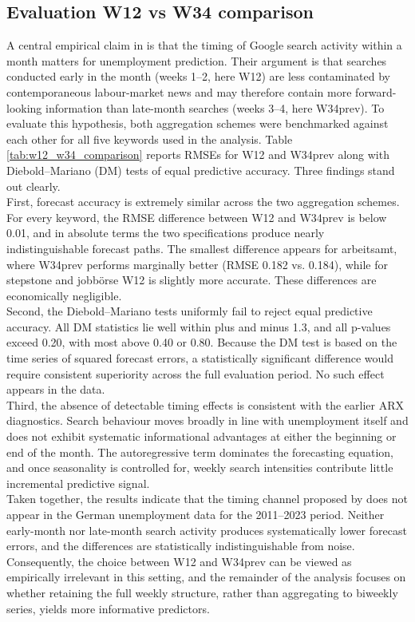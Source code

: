 \documentclass[12pt,a4paper]{article}
\begin{document}
\subsection{Evaluation W12 vs W34 comparison}
A central empirical claim in \citet{Askitas} is that the timing of Google search activity within a month matters for unemployment prediction. Their argument is that searches conducted early in the month (weeks 1–2, here W12) are less contaminated by contemporaneous labour-market news and may therefore contain more forward-looking information than late-month searches (weeks 3–4, here W34prev).
To evaluate this hypothesis, both aggregation schemes were benchmarked against each other for all five keywords used in the analysis.
Table \ref{tab:w12_w34_comparison} reports RMSEs for W12 and W34prev along with Diebold–Mariano (DM) tests of equal predictive accuracy. Three findings stand out clearly.\\
First, forecast accuracy is extremely similar across the two aggregation schemes.
For every keyword, the RMSE difference between W12 and W34prev is below 0.01, and in absolute terms the two specifications produce nearly indistinguishable forecast paths.
The smallest difference appears for arbeitsamt, where W34prev performs marginally better (RMSE 0.182 vs. 0.184), while for stepstone and jobbörse W12 is slightly more accurate. These differences are economically negligible.\\
Second, the Diebold–Mariano tests uniformly fail to reject equal predictive accuracy.
All DM statistics lie well within plus and minus 1.3, and all p-values exceed 0.20, with most above 0.40 or 0.80.
Because the DM test is based on the time series of squared forecast errors, a statistically significant difference would require consistent superiority across the full evaluation period. No such effect appears in the data.\\
Third, the absence of detectable timing effects is consistent with the earlier ARX diagnostics.
Search behaviour moves broadly in line with unemployment itself and does not exhibit systematic informational advantages at either the beginning or end of the month. The autoregressive term dominates the forecasting equation, and once seasonality is controlled for, weekly search intensities contribute little incremental predictive signal.\\
Taken together, the results indicate that the timing channel proposed by \citet{Askitas} does not appear in the German unemployment data for the 2011–2023 period.
Neither early-month nor late-month search activity produces systematically lower forecast errors, and the differences are statistically indistinguishable from noise.
Consequently, the choice between W12 and W34prev can be viewed as empirically irrelevant in this setting, and the remainder of the analysis focuses on whether retaining the full weekly structure, rather than aggregating to biweekly series, yields more informative predictors.
\end{document}
